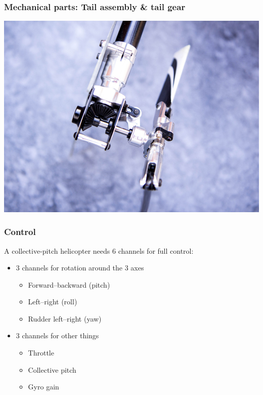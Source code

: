 \documentclass{beamer}
\begin{document}
\begin{frame}
\frametitle{Mechanical parts: Tail assembly \& tail gear}

\begin{center}
	\includegraphics[width=.8\textwidth]{images/IMG_0654_cropped_smaller}
\end{center}

\end{frame}

\begin{frame}
\frametitle{Control}

A collective-pitch helicopter needs 6 channels for full control:
\begin{itemize}
	\item 3 channels for rotation around the 3 axes
	\begin{itemize}
		\item Forward--backward (pitch)
		\item Left--right (roll)
		\item Rudder left--right (yaw)
	\end{itemize}
	\item 3 channels for other things
	\begin{itemize}
		\item Throttle
		\item Collective pitch
		\item Gyro gain
	\end{itemize}
\end{itemize}

\end{frame}
\end{document}
